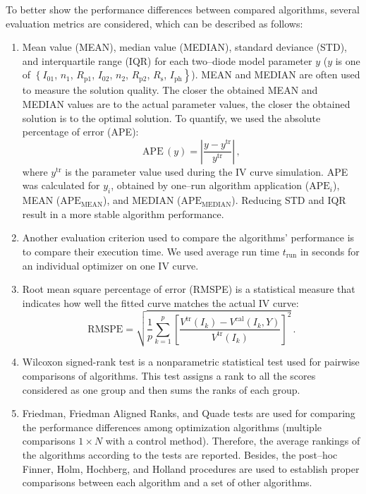 \documentclass[a4paper,fleqn]{cas-dc}
\begin{document}
To better show the performance differences between compared algorithms,
several evaluation metrics are considered, which can be described as follows:
\begin{enumerate}[1.]
\item
Mean value (MEAN), median value (MEDIAN), standard deviance (STD), and interquartile range (IQR)
for each two--diode model parameter $y$
($y$ is one of $\left\{I_{01}\right.$, $n_1$, $R_\mathrm{p1}$, $I_{02}$, $n_2$, $R_\mathrm{p2}$, $R_\mathrm{s}$, $\left.I_\mathrm{ph}\right\}$).
MEAN and MEDIAN are often used to measure the solution quality.
The closer the obtained MEAN and MEDIAN values are to the actual parameter values,
the closer the obtained solution is to the optimal solution.
To quantify, we used the  absolute percentage of error (APE):
\begin{equation}
\label{eqAPE}
\mathrm{APE}\,(y)= \left| \frac{y-y^\mathrm{tr}}{y^\mathrm{tr}}\right|\,,
\end{equation}
where
$y^\mathrm{tr}$ is the parameter value used during the IV curve simulation.
APE was calculated for $y_i$, obtained by one--run algorithm application ($\mathrm{APE}_i$),
MEAN ($\mathrm{APE}_\mathrm{MEAN}$), and MEDIAN ($\mathrm{APE}_\mathrm{MEDIAN}$).
Reducing STD and IQR result in a more stable algorithm performance.

\item
Another evaluation criterion used to compare the algorithms’ performance is to compare their execution time.
We used average run time $t_\mathrm{run}$ in seconds for an
individual optimizer on one IV curve.

\item
Root mean square percentage of error (RMSPE) is a statistical measure that indicates
how well the fitted curve matches the actual IV curve:
\begin{equation}
\label{eqRMSPE}
\mathrm{RMSPE}= \sqrt{\frac{1}{p} \sum_{k=1}^p \left[\frac{V^\mathrm{tr}(I_k)-V^\mathrm{cal}(I_k,Y)}{V^\mathrm{tr}(I_k)} \right]^2}\,.
\end{equation}

\item
Wilcoxon signed-rank test is a nonparametric statistical test used for pairwise comparisons of algorithms.
This test assigns a rank to all the scores considered as one group and then sums the ranks of each group.

\item
Friedman, Friedman Aligned Ranks, and Quade tests are used for comparing the performance differences
among optimization algorithms
(multiple comparisons $1\times N$ with a control method).
Therefore, the average rankings of the algorithms according to the
tests are reported.
Besides, the post--hoc  Finner, Holm, Hochberg, and Holland procedures
are used to establish proper comparisons between each algorithm and a set of other algorithms.


\end{enumerate}
\end{document}

